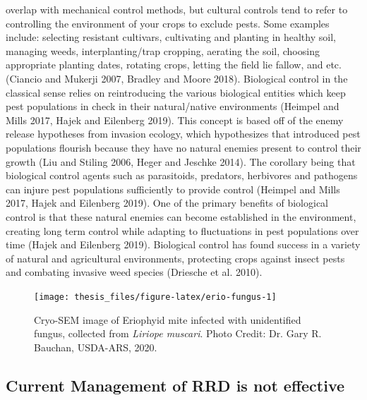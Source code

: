 \documentclass[12pt,final,CPage]{ufthesis}
\begin{document}
{overlap with mechanical control methods, but cultural controls tend to refer to controlling the environment of your crops to exclude pests. Some examples include: selecting resistant cultivars, cultivating and planting in healthy soil, managing weeds, interplanting/trap cropping, aerating the soil, choosing appropriate planting dates, rotating crops, letting the field lie fallow, and etc. (Ciancio and Mukerji 2007, Bradley and Moore 2018). Biological control in the classical sense relies on reintroducing the various biological entities which keep pest populations in check in their natural/native environments (Heimpel and Mills 2017, Hajek and Eilenberg 2019). This concept is based off of the enemy release hypotheses from invasion ecology, which hypothesizes that introduced pest populations flourish because they have no natural enemies present to control their growth (Liu and Stiling 2006, Heger and Jeschke 2014). The corollary being that biological control agents such as parasitoids, predators, herbivores and pathogens can injure pest populations sufficiently to provide control (Heimpel and Mills 2017, Hajek and Eilenberg 2019). One of the primary benefits of biological control is that these natural enemies can become established in the environment, creating long term control while adapting to fluctuations in pest populations over time (Hajek and Eilenberg 2019). Biological control has found success in a variety of natural and agricultural environments, protecting crops against insect pests and combating invasive weed species (Driesche et al. 2010).
  \begin{figure}

  {\centering \texttt{[image: thesis\_files/figure-latex/erio-fungus-1]} 

  }

  \caption{Cryo-SEM image of Eriophyid mite infected with unidentified fungus, collected from \textit{Liriope muscari}. Photo Credit: Dr. Gary R. Bauchan, USDA-ARS, 2020.}\label{fig:erio-fungus}
  \end{figure}
  \hypertarget{litrev-manage}{%
  \subsection{Current Management of RRD is not effective}\label{litrev-manage}}

}
\end{document}
